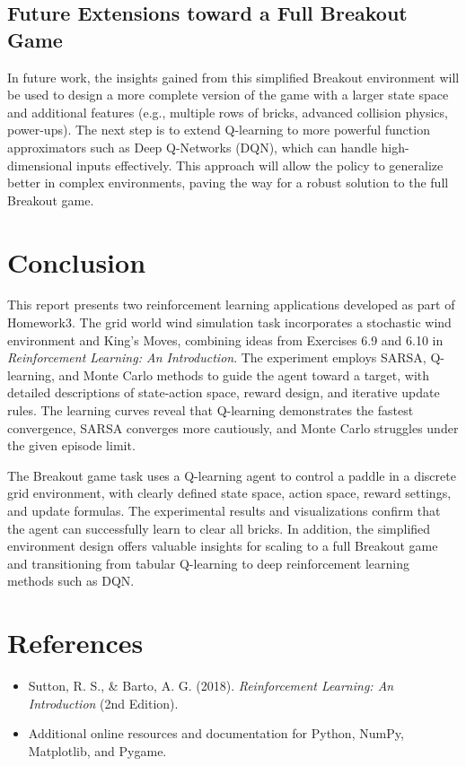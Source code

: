 \documentclass{article}
\begin{document}
\subsection{Future Extensions toward a Full Breakout Game}
In future work, the insights gained from this simplified Breakout environment will be used to design a more complete version of the game with a larger state space and additional features (e.g., multiple rows of bricks, advanced collision physics, power-ups). The next step is to extend Q-learning to more powerful function approximators such as Deep Q-Networks (DQN), which can handle high-dimensional inputs effectively. This approach will allow the policy to generalize better in complex environments, paving the way for a robust solution to the full Breakout game.

\section{Conclusion}
This report presents two reinforcement learning applications developed as part of Homework3. The grid world wind simulation task incorporates a stochastic wind environment and King’s Moves, combining ideas from Exercises 6.9 and 6.10 in \emph{Reinforcement Learning: An Introduction}. The experiment employs SARSA, Q-learning, and Monte Carlo methods to guide the agent toward a target, with detailed descriptions of state-action space, reward design, and iterative update rules. The learning curves reveal that Q-learning demonstrates the fastest convergence, SARSA converges more cautiously, and Monte Carlo struggles under the given episode limit.

The Breakout game task uses a Q-learning agent to control a paddle in a discrete grid environment, with clearly defined state space, action space, reward settings, and update formulas. The experimental results and visualizations confirm that the agent can successfully learn to clear all bricks. In addition, the simplified environment design offers valuable insights for scaling to a full Breakout game and transitioning from tabular Q-learning to deep reinforcement learning methods such as DQN.

\section{References}
\begin{itemize}
    \item Sutton, R. S., \& Barto, A. G. (2018). \emph{Reinforcement Learning: An Introduction} (2nd Edition).
    \item Additional online resources and documentation for Python, NumPy, Matplotlib, and Pygame.
\end{itemize}
\end{document}
